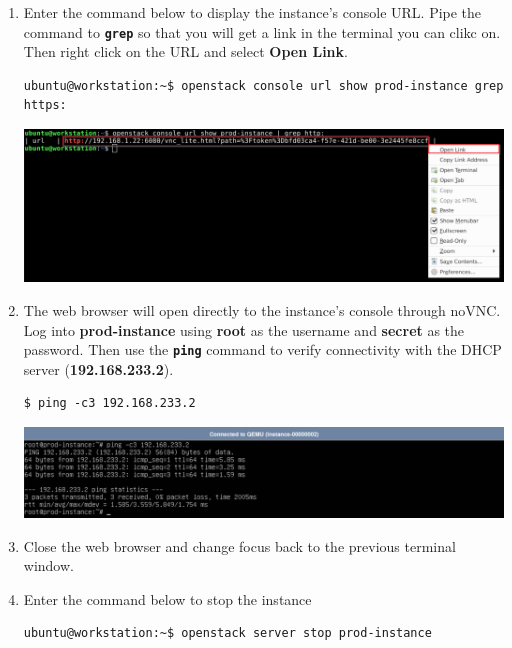 \documentclass[letterpaper, 12pt]{article}
\begin{document}
\begin{enumerate}
    \item Enter the command below to display the instance's console URL. Pipe the command to \textbf{\texttt{grep}} so
    that you will get a link in the terminal you can clikc on. Then right click on the URL and select \textbf{Open
    Link}.
\begin{lstlisting}
ubuntu@workstation:~$ openstack console url show prod-instance grep https:
\end{lstlisting}

    \begin{center}
        \includegraphics[width=\linewidth]{images/part2/step15.png}
    \end{center}

    \item The web browser will open directly to the instance's console through noVNC. Log into \textbf{prod-instance}
    using \textbf{root} as the username and \textbf{secret} as the password. Then use the \textbf{\texttt{ping}}
    command to verify connectivity with the DHCP server (\textbf{192.168.233.2}).
\begin{lstlisting}
$ ping -c3 192.168.233.2
\end{lstlisting}

    \begin{center}
        \includegraphics[width=\linewidth]{images/part2/step16.png}
    \end{center}

    \item Close the web browser and change focus back to the previous terminal window.
    
    \item Enter the command below to stop the instance
\begin{lstlisting}
ubuntu@workstation:~$ openstack server stop prod-instance
\end{lstlisting}


\end{enumerate}
\end{document}
